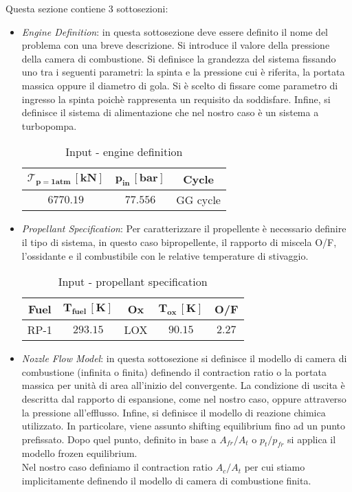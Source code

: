 Questa sezione contiene 3 sottosezioni:
\begin{itemize}
\item \textit{Engine Definition}: in questa sottosezione deve essere definito il nome del problema con una breve descrizione. Si introduce il valore della pressione della camera di combustione. Si definisce la grandezza del sistema fissando uno tra i seguenti parametri: la spinta e la pressione cui è riferita, la portata massica oppure il diametro di gola. Si è scelto di fissare come parametro di ingresso la spinta	 poichè rappresenta un requisito da soddisfare. Infine, si definisce il sistema di alimentazione che nel nostro caso è un sistema a turbopompa.
\begin{table}[H]

\centering
\begin{tabular}{|c|c|c|}
\hline
$\bm{\mathcal{T}_{p=1atm} \, [kN]} $ & $\bm{p_{in} \, [bar]}$ & \textbf{Cycle} \\
\hline
$6770.19$ & $77.556$ & {GG cycle} \\
\hline
\end{tabular}
\caption{Input - engine definition}
\label{table:engine_def}
\end{table}


\item \textit{Propellant Specification}: Per caratterizzare il propellente è necessario definire il tipo di sistema, in questo caso bipropellente, il rapporto di miscela O/F, l'ossidante e il combustibile con le relative temperature di stivaggio. 
\begin{table}[H]
\centering
\begin{tabular}{|c|c|c|c|c|}
\hline
\textbf{Fuel} & $\bm{T_{fuel} \, [K]}$ & \textbf{Ox} & $\bm{T_{ox} \, [K]}$  & \textbf{O/F}\\
\hline
{RP-1} & $293.15$ & {LOX} & $90.15$ & $2.27$\\
\hline
\end{tabular}
\caption{Input - propellant specification}
\label{table:prop_spec}
\end{table}
\item \textit{Nozzle Flow Model}: in questa sottosezione si definisce il modello di camera di combustione (infinita o finita) definendo il contraction ratio o la portata massica per unità di area all'inizio del convergente. La  condizione di uscita è descritta dal rapporto di espansione, come nel nostro caso, oppure attraverso la pressione all'efflusso. Infine, si definisce il modello di reazione chimica utilizzato. In particolare, viene assunto shifting equilibrium fino ad un punto prefissato. Dopo quel punto, definito in base a $A_{fr}/A_t$ o $p_t/p_{fr}$ si applica il modello frozen equilibrium. \\
Nel nostro caso definiamo il contraction ratio $A_c/A_t$ per cui stiamo implicitamente definendo il modello di camera di combustione finita.


\end{itemize}
